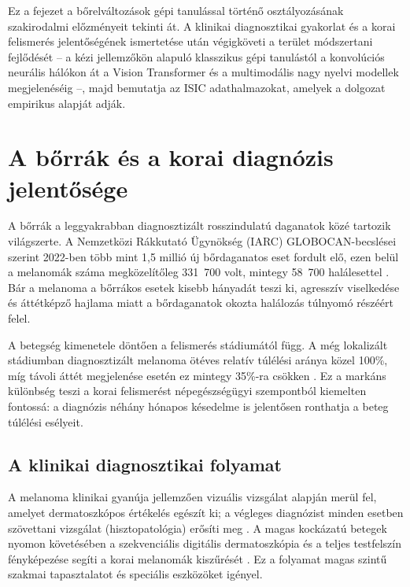 
Ez a fejezet a bőrelváltozások gépi tanulással történő osztályozásának
szakirodalmi előzményeit tekinti át. A klinikai diagnosztikai gyakorlat és a
korai felismerés jelentőségének ismertetése után végigköveti a terület
módszertani fejlődését -- a kézi jellemzőkön alapuló klasszikus gépi tanulástól a
konvolúciós neurális hálókon át a Vision Transformer és a multimodális nagy
nyelvi modellek megjelenéséig --, majd bemutatja az ISIC adathalmazokat, amelyek
a dolgozat empirikus alapját adják.

\section{A bőrrák és a korai diagnózis jelentősége}

A bőrrák a leggyakrabban diagnosztizált rosszindulatú daganatok közé tartozik
világszerte. A Nemzetközi Rákkutató Ügynökség (IARC) GLOBOCAN-becslései szerint
2022-ben több mint 1,5 millió új bőrdaganatos eset fordult elő, ezen belül a
melanomák száma megközelítőleg 331~700 volt, mintegy 58~700 halálesettel
\cite{iarc2022melanoma}. Bár a melanoma a bőrrákos esetek kisebb hányadát teszi
ki, agresszív viselkedése és áttétképző hajlama miatt a bőrdaganatok okozta halálozás
túlnyomó részéért felel.

A betegség kimenetele döntően a felismerés stádiumától függ. A még lokalizált
stádiumban diagnosztizált melanoma ötéves relatív túlélési aránya közel 100\%,
míg távoli áttét megjelenése esetén ez mintegy 35\%-ra csökken
\cite{seer2024melanoma}. Ez a markáns különbség teszi a korai felismerést
népegészségügyi szempontból kiemelten fontossá: a diagnózis néhány hónapos
késedelme is jelentősen ronthatja a beteg túlélési esélyeit.

\subsection{A klinikai diagnosztikai folyamat}

A melanoma klinikai gyanúja jellemzően vizuális vizsgálat alapján merül fel,
amelyet dermatoszkópos értékelés egészít ki; a végleges diagnózist minden
esetben szövettani vizsgálat (hisztopatológia) erősíti meg \cite{garbe2022melanoma}.
A magas kockázatú betegek nyomon követésében a szekvenciális digitális
dermatoszkópia és a teljes testfelszín fényképezése segíti a korai melanomák
kiszűrését \cite{garbe2022melanoma}. Ez a folyamat magas szintű szakmai
tapasztalatot és speciális eszközöket igényel.

